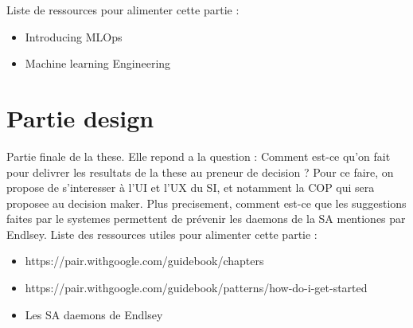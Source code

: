 Liste de ressources pour alimenter cette partie :
\begin{itemize}
    \item Introducing MLOps
    \item Machine learning Engineering
\end{itemize}


\section{Partie design}

Partie finale de la these.
Elle repond a la question : Comment est-ce qu'on fait pour delivrer les resultats de la these au preneur de decision ?
Pour ce faire, on propose de s'interesser à l'UI et l'UX du SI, et notamment la COP qui sera proposee au decision maker.
Plus precisement, comment est-ce que les suggestions faites par le systemes permettent de prévenir les daemons de la SA mentiones par Endlsey.
Liste des ressources utiles pour alimenter cette partie :
\begin{itemize}
    \item https://pair.withgoogle.com/guidebook/chapters
    \item https://pair.withgoogle.com/guidebook/patterns/how-do-i-get-started
    \item Les SA daemons de Endlsey
\end{itemize}



